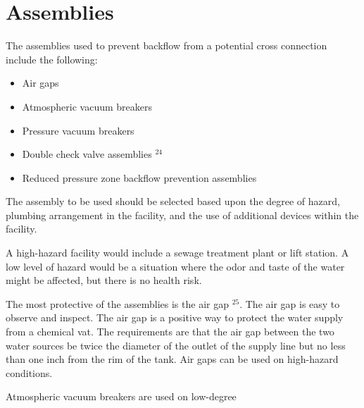 \documentclass[10pt]{article}
\begin{document}
\section{Assemblies}
The assemblies used to prevent backflow from a potential cross connection include the following:

\begin{itemize}
  \item Air gaps

  \item Atmospheric vacuum breakers

  \item Pressure vacuum breakers

  \item Double check valve assemblies ${ }^{24}$

  \item Reduced pressure zone backflow prevention assemblies

\end{itemize}
The assembly to be used should be selected based upon the degree of hazard, plumbing arrangement in the facility, and the use of additional devices within the facility.

A high-hazard facility would include a sewage treatment plant or lift station. A low level of hazard would be a situation where the odor and taste of the water might be affected, but there is no health risk.

The most protective of the assemblies is the air gap $^{25}$. The air gap is easy to observe and inspect. The air gap is a positive way to protect the water supply from a chemical vat. The requirements are that the air gap between the two water sources be twice the diameter of the outlet of the supply line but no less than one inch from the rim of the tank. Air gaps can be used on high-hazard conditions.

Atmospheric vacuum breakers are used on low-degree
\end{document}

